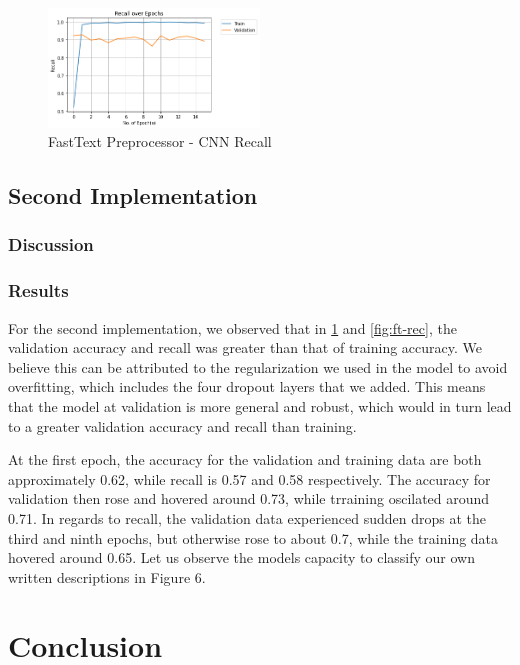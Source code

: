 \documentclass[12pt]{report}
\begin{document}
\begin{figure}[h!]
	\includegraphics[width=0.5\textwidth]{recall.png}
	\caption{FastText Preprocessor - CNN Recall}
	\label{fig:ft-acc}
\end{figure}


\section{Second Implementation}

\subsection{Discussion}

\subsection{Results}

For the second implementation, we observed that in \ref{fig:ft-acc} and
\ref{fig:ft-rec}, the validation accuracy and
recall was greater than that of training accuracy. We believe this can be
attributed to the regularization we used in the model to avoid overfitting,
which includes the four dropout layers that we added. This means that the model
at validation is more general and robust, which would in turn lead to a greater
validation accuracy and recall than training.

At the first epoch, the accuracy for the validation and training data are both
approximately 0.62, while recall is 0.57 and 0.58 respectively. The accuracy
for validation then rose and hovered around 0.73, while trraining oscilated
around 0.71. In regards to recall, the validation data experienced sudden drops
at the third and ninth epochs, but otherwise rose to about 0.7, while the
training data hovered around 0.65. Let us observe the models capacity to classify
our own written descriptions in Figure 6.



\chapter{Conclusion}
\end{document}

